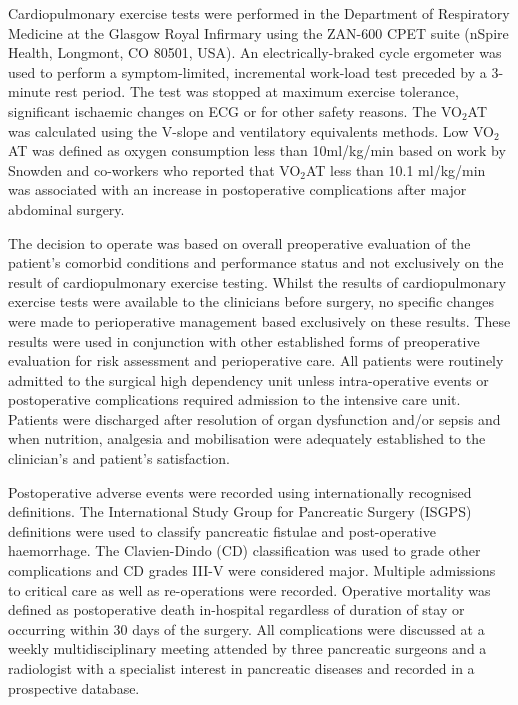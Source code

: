 Cardiopulmonary exercise tests were performed in the Department of Respiratory Medicine at the Glasgow Royal Infirmary using the ZAN-600 CPET suite (nSpire Health, Longmont, CO 80501, USA). An electrically-braked cycle ergometer was used to perform a symptom-limited, incremental work-load test preceded by a 3-minute rest period. The test was stopped at maximum exercise tolerance, significant ischaemic changes on ECG or for other safety reasons. The VO$_2$AT was calculated using the V-slope\parencite{beaver_new_1986, sue_metabolic_1988} and ventilatory equivalents\parencite{sue_metabolic_1988} methods. Low VO$_2$AT was defined as oxygen consumption less than 10ml/kg/min based on work by Snowden and co-workers\parencite{snowden_submaximal_2010} who reported that VO$_2$AT less than 10.1 ml/kg/min was associated with an increase in postoperative complications after major abdominal surgery.

The decision to operate was based on overall preoperative evaluation of the patient’s comorbid conditions and performance status and not exclusively on the result of cardiopulmonary exercise testing. Whilst the results of cardiopulmonary exercise tests were available to the clinicians before surgery, no specific changes were made to perioperative management based exclusively on these results. These results were used in conjunction with other established forms of preoperative evaluation for risk assessment and perioperative care. All patients were routinely admitted to the surgical high dependency unit unless intra-operative events or postoperative complications required admission to the intensive care unit. Patients were discharged after resolution of organ dysfunction and/or sepsis and when nutrition, analgesia and mobilisation were adequately established to the clinician's and patient's satisfaction.

Postoperative adverse events were recorded using internationally recognised definitions. The International Study Group for Pancreatic Surgery (ISGPS) definitions were used to classify pancreatic fistulae\parencite{bassi_postoperative_2005} and post-operative haemorrhage\parencite{wente_postpancreatectomy_2007}. The Clavien-Dindo (CD) classification\parencite{clavien_clavien-dindo_2009, dindo_classification_2004} was used to grade other complications and CD grades III-V were considered major. Multiple admissions to critical care as well as re-operations were recorded. Operative mortality was defined as postoperative death in-hospital regardless of duration of stay or occurring within 30 days of the surgery. All complications were discussed at a weekly multidisciplinary meeting attended by three pancreatic surgeons and a radiologist with a specialist interest in pancreatic diseases and recorded in a prospective database.

